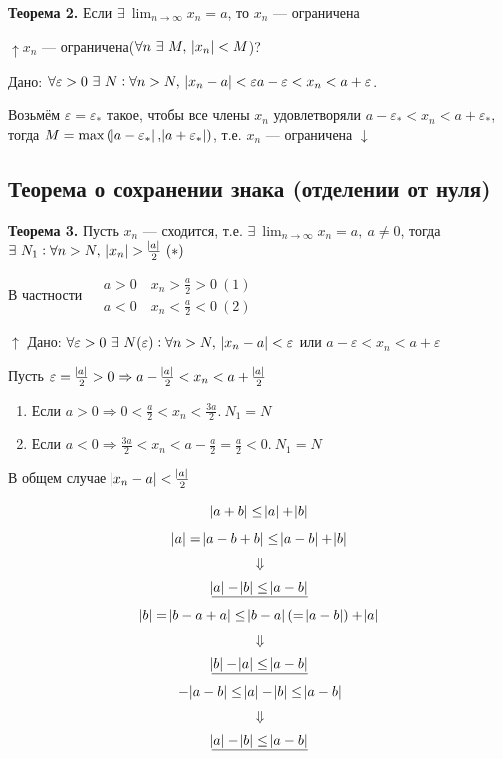 \documentclass{article}
\begin{document}
    \textbf{Теорема 2.} Если \(\exists\ \lim_{n \rightarrow \infty}{x_n} = a\), то \(x_n\) --- ограничена
    
    \(\uparrow x_n\) --- ограничена(\(\forall n\ \exists\ M,\ \abs{x_n} < M\))?
    
    Дано: \(\forall \varepsilon > 0\ \exists\ N : \forall n > N,\ \abs{x_n - a} < \varepsilon\\ a - \varepsilon < x_n < a + \varepsilon\).
    
    Возьмём \(\varepsilon = \varepsilon_*\) такое, чтобы все члены \(x_n\) удовлетворяли \(a - \varepsilon_* < x_n < a + \varepsilon_*\),\\
    тогда \(M = \max{(\abs{a - \varepsilon_*}, \abs{a + \varepsilon_*})}\), т.е. \(x_n\) --- ограничена \(\downarrow\)
    
    \subsection{Теорема о сохранении знака (отделении от нуля)}
    
    \textbf{Теорема 3.} Пусть \(x_n\) --- сходится, т.е. \(\exists\ \lim_{n \rightarrow \infty}{x_n} = a,\ a \not = 0\), тогда \(\exists\ N_1 : \forall n > N,\ \abs{x_n} > \frac{\abs{a}}{2}\ (*)\)
    
    В частности \(\begin{aligned}
    	&a > 0 \quad x_n > \frac{a}{2} > 0\ (1)\\
        &a < 0 \quad x_n < \frac{a}{2} < 0\ (2)
    \end{aligned}\)
    
    \(\uparrow\) Дано: \(\forall \varepsilon > 0\ \exists\ N(\varepsilon) : \forall n > N,\ \abs{x_n - a} < \varepsilon\) или \(a - \varepsilon < x_n < a + \varepsilon\)
    
    Пусть \(\varepsilon = \frac{\abs{a}}{2} > 0 \Rightarrow a - \frac{\abs{a}}{2} < x_n < a + \frac{\abs{a}}{2}\)
    \begin{enumerate}
    	\item Если \(a > 0 \Rightarrow 0 < \frac{a}{2} < x_n < \frac{3a}{2}.\ N_1 = N\)
        \item Если \(a < 0 \Rightarrow \frac{3a}{2} < x_n < a - \frac{a}{2} = \frac{a}{2} < 0.\ N_1 = N\)
    \end{enumerate}
    
    В общем случае \(\abs{x_n - a} < \frac{\abs{a}}{2}\)
    
    \[\abs{a + b} \leq \abs{a} + \abs{b}\]
    \[\abs{a} = \abs{a - b + b} \leq \abs{a - b} + \abs{b}\]
    \[\Downarrow\]
    \[\underline{\abs{a} - \abs{b} \leq \abs{a - b}}\]
    \[\abs{b} = \abs{b - a + a} \leq \abs{b - a}(= \abs{a - b}) + \abs{a}\]
    \[\Downarrow\]
    \[\underline{\abs{b} - \abs{a} \leq \abs{a - b}}\]
    \[-\abs{a-b} \leq \abs{a} - \abs{b} \leq \abs{a - b}\]
    \[\Downarrow\]
    \[\underline{\abs{a} - \abs{b} \leq \abs{a - b}}\]
    
\end{document}
